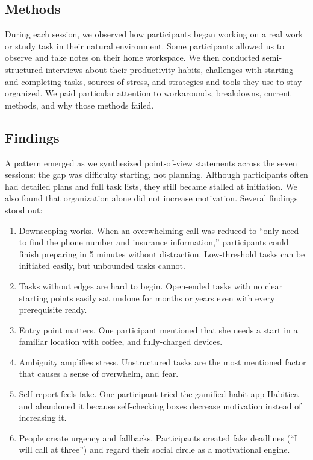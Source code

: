 \documentclass[sigplan,screen]{acmart}
\begin{document}
\subsection{Methods}
During each session, we observed how participants began working on a real work or study task in their natural environment. Some participants allowed us to observe and take notes on their home workspace. We then conducted semi-structured interviews about their productivity habits, challenges with starting and completing tasks, sources of stress, and strategies and tools they use to stay organized. We paid particular attention to workarounds, breakdowns, current methods, and why those methods failed.

\subsection{Findings}
A pattern emerged as we synthesized point-of-view statements across the seven sessions: the gap was difficulty starting, not planning. Although participants often had detailed plans and full task lists, they still became stalled at initiation. We also found that organization alone did not increase motivation. Several findings stood out:
\begin{enumerate}
  \item Downscoping works. When an overwhelming call was reduced to ``only need to find the phone number and insurance information,'' participants could finish preparing in 5 minutes without distraction. Low-threshold tasks can be initiated easily, but unbounded tasks cannot.
  \item Tasks without edges are hard to begin. Open-ended tasks with no clear starting points easily sat undone for months or years even with every prerequisite ready.
  \item Entry point matters. One participant mentioned that she needs a start in a familiar location with coffee, and fully-charged devices.
  \item Ambiguity amplifies stress. Unstructured tasks are the most mentioned factor that causes a sense of overwhelm, and fear.
  \item Self-report feels fake. One participant tried the gamified habit app Habitica and abandoned it because self-checking boxes decrease motivation instead of increasing it.
  \item People create urgency and fallbacks. Participants created fake deadlines (``I will call at three'') and regard their social circle as a motivational engine.
\end{enumerate}
\end{document}
